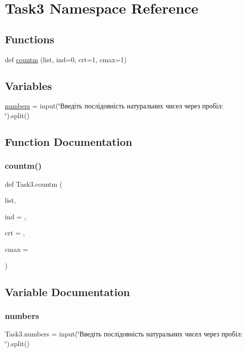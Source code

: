 \hypertarget{namespace_task3}{}\section{Task3 Namespace Reference}
\label{namespace_task3}
\subsection*{Functions}
\begin{DoxyCompactItemize}
\item 
def \hyperlink{namespace_task3_a6d11c039dec959010f312b0e0d3ca64a}{countm} (list, ind=0, crt=1, cmax=1)
\end{DoxyCompactItemize}
\subsection*{Variables}
\begin{DoxyCompactItemize}
\item 
\hyperlink{namespace_task3_a42c2f8d5fca89733308e3c4d6b7eba36}{numbers} = input(\char`\"{}Введіть послідовність натуральних чисел через пробіл\+: \char`\"{}).split()
\end{DoxyCompactItemize}


\subsection{Function Documentation}
\mbox{\label{namespace_task3_a6d11c039dec959010f312b0e0d3ca64a}} 
\subsubsection{\texorpdfstring{countm()}{countm()}}
{\footnotesize\ttfamily def Task3.\+countm (\begin{DoxyParamCaption}\item[{}]{list,  }\item[{}]{ind = {},  }\item[{}]{crt = {},  }\item[{}]{cmax = {} }\end{DoxyParamCaption})}



\subsection{Variable Documentation}
\mbox{\label{namespace_task3_a42c2f8d5fca89733308e3c4d6b7eba36}} 
\subsubsection{\texorpdfstring{numbers}{numbers}}
{\footnotesize\ttfamily Task3.\+numbers = input(\char`\"{}Введіть послідовність натуральних чисел через пробіл\+: \char`\"{}).split()}

